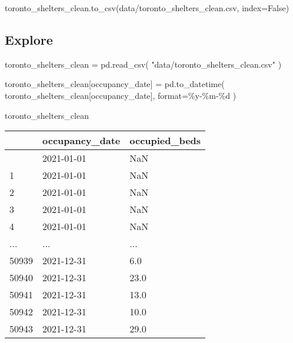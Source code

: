 \documentclass[
  letterpaper,
  DIV=11,
  numbers=noendperiod]{scrreprt}
\newenvironment{Shaded}{\begin{snugshade}}{\end{snugshade}}
\newcommand{\BuiltInTok}[1]{\textcolor[rgb]{0.00,0.23,0.31}{#1}}
\newcommand{\NormalTok}[1]{\textcolor[rgb]{0.00,0.23,0.31}{#1}}
\newcommand{\OperatorTok}[1]{\textcolor[rgb]{0.37,0.37,0.37}{#1}}
\newcommand{\SpecialCharTok}[1]{\textcolor[rgb]{0.37,0.37,0.37}{#1}}
\newcommand{\StringTok}[1]{\textcolor[rgb]{0.13,0.47,0.30}{#1}}
\newcommand{\VariableTok}[1]{\textcolor[rgb]{0.07,0.07,0.07}{#1}}
\begin{document}
\begin{Shaded}
\begin{Highlighting}[]
\NormalTok{toronto\_shelters\_clean.to\_csv(}\StringTok{\textquotesingle{}data/toronto\_shelters\_clean.csv\textquotesingle{}}\NormalTok{, index}\OperatorTok{=}\VariableTok{False}\NormalTok{)}
\end{Highlighting}
\end{Shaded}

\hypertarget{explore-1}{%
\subsection{Explore}\label{explore-1}}

\begin{Shaded}
\begin{Highlighting}[]
\NormalTok{toronto\_shelters\_clean }\OperatorTok{=}\NormalTok{ pd.read\_csv(}
    \StringTok{"data/toronto\_shelters\_clean.csv"}
\NormalTok{)}

\NormalTok{toronto\_shelters\_clean[}\StringTok{\textquotesingle{}occupancy\_date\textquotesingle{}}\NormalTok{] }\OperatorTok{=}\NormalTok{ pd.to\_datetime(}
\NormalTok{    toronto\_shelters\_clean[}\StringTok{\textquotesingle{}occupancy\_date\textquotesingle{}}\NormalTok{],}
    \BuiltInTok{format}\OperatorTok{=}\StringTok{\textquotesingle{}\%y{-}\%m{-}}\SpecialCharTok{\%d}\StringTok{\textquotesingle{}}
\NormalTok{)}

\NormalTok{toronto\_shelters\_clean}
\end{Highlighting}
\end{Shaded}

\begin{longtable}[]{@{}lll@{}}
\toprule\noalign{}
& occupancy\_date & occupied\_beds \\
\midrule\noalign{}
\endhead
\bottomrule\noalign{}
\endlastfoot
0 & 2021-01-01 & NaN \\
1 & 2021-01-01 & NaN \\
2 & 2021-01-01 & NaN \\
3 & 2021-01-01 & NaN \\
4 & 2021-01-01 & NaN \\
... & ... & ... \\
50939 & 2021-12-31 & 6.0 \\
50940 & 2021-12-31 & 23.0 \\
50941 & 2021-12-31 & 13.0 \\
50942 & 2021-12-31 & 10.0 \\
50943 & 2021-12-31 & 29.0 \\
\end{longtable}
\end{document}
